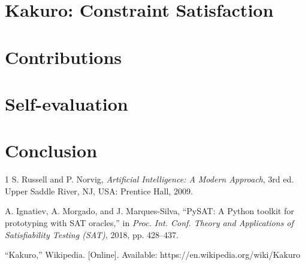 \documentclass[conference]{IEEEtran}
\begin{document}

\section{Kakuro: Constraint Satisfaction}

\section{Contributions}

\section{Self-evaluation}

\section{Conclusion}

\begin{thebibliography}{1}
 S. Russell and P. Norvig, \textit{Artificial Intelligence: A Modern Approach}, 3rd ed.
Upper Saddle River, NJ, USA: Prentice Hall, 2009.

 A. Ignatiev, A. Morgado, and J. Marques-Silva, ``PySAT: A Python toolkit for
prototyping with SAT oracles,'' in \textit{Proc. Int. Conf. Theory and Applications of
Satisfiability Testing (SAT)}, 2018, pp. 428--437.

 ``Kakuro,'' Wikipedia. [Online]. Available: https://en.wikipedia.org/wiki/Kakuro
\end{thebibliography}
\end{document}
